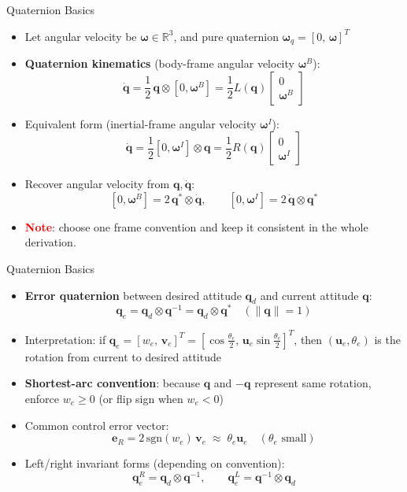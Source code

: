 \begin{frame}{Quaternion Basics}
    \begin{itemize}
        \setlength{\itemsep}{0.55em}
        \setlength{\parskip}{0.2em}
        \item Let angular velocity be $\boldsymbol{\omega}\in\mathbb{R}^3$, and pure quaternion
        $\boldsymbol{\omega}_q=[0,\,\boldsymbol{\omega}]^T$
        \item \textbf{Quaternion kinematics} (body-frame angular velocity $\boldsymbol{\omega}^B$):
        $$\dot{\mathbf{q}}=\frac{1}{2}\,\mathbf{q}\otimes[0,\boldsymbol{\omega}^B]
        =\frac{1}{2}L(\mathbf{q})\begin{bmatrix}0\\\boldsymbol{\omega}^B\end{bmatrix}$$
        \item Equivalent form (inertial-frame angular velocity $\boldsymbol{\omega}^I$):
        $$\dot{\mathbf{q}}=\frac{1}{2}[0,\boldsymbol{\omega}^I]\otimes\mathbf{q}
        =\frac{1}{2}R(\mathbf{q})\begin{bmatrix}0\\\boldsymbol{\omega}^I\end{bmatrix}$$
        \item Recover angular velocity from $\mathbf{q},\dot{\mathbf{q}}$:
        $$[0,\boldsymbol{\omega}^B]=2\,\mathbf{q}^*\otimes\dot{\mathbf{q}},\qquad
        [0,\boldsymbol{\omega}^I]=2\,\dot{\mathbf{q}}\otimes\mathbf{q}^*$$
        \item \textcolor{red}{\textbf{Note}}: choose one frame convention and keep it consistent in the whole derivation.
    \end{itemize}
\end{frame}

\begin{frame}{Quaternion Basics}
    \begin{itemize}
        \setlength{\itemsep}{0.55em}
        \setlength{\parskip}{0.2em}
        \item \textbf{Error quaternion} between desired attitude $\mathbf{q}_d$ and current attitude $\mathbf{q}$:
        $$\mathbf{q}_e=\mathbf{q}_d\otimes\mathbf{q}^{-1}=\mathbf{q}_d\otimes\mathbf{q}^*\quad(\|\mathbf{q}\|=1)$$
        \item Interpretation: if $\mathbf{q}_e=[w_e,\,\mathbf{v}_e]^T=\left[\cos\frac{\theta_e}{2},\,\mathbf{u}_e\sin\frac{\theta_e}{2}\right]^T$,
        then $(\mathbf{u}_e,\theta_e)$ is the rotation from current to desired attitude
        \item \textbf{Shortest-arc convention}: because $\mathbf{q}$ and $-\mathbf{q}$ represent same rotation,
        enforce $w_e\ge 0$ (or flip sign when $w_e<0$)
        \item Common control error vector:
        $$\mathbf{e}_R=2\,\mathrm{sgn}(w_e)\,\mathbf{v}_e\;\approx\;\theta_e\mathbf{u}_e\quad(\theta_e\text{ small})$$
        \item Left/right invariant forms (depending on convention):
        $$\mathbf{q}_e^R=\mathbf{q}_d\otimes\mathbf{q}^{-1},\qquad
        \mathbf{q}_e^L=\mathbf{q}^{-1}\otimes\mathbf{q}_d$$
    \end{itemize}
\end{frame}
